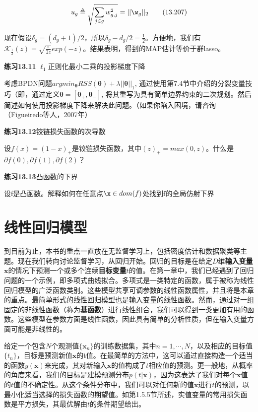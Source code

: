 \documentclass[a4paper]{article}
\begin{document}
\begin{equation}
	u_g\triangleq\sqrt{\sum_{j\in g}w_{g,j}^2}=||\w_g||_2\tag{13.207}
\end{equation}

现在假设$\delta_g=(d_g+1)/2$，所以$\delta_g-d_g/2=\frac{1}{2}$。方便地，我们有$\mathcal{K}_{\frac{1}{2}}(z)=\sqrt{\frac{\pi}{2z}}exp(-z)$。结果表明，得到的MAP估计等价于群lasso。

\textbf{练习13.11} $\ell_1$正则化最小二乘的投影梯度下降

考虑BPDN问题$argmin_{\boldsymbol{\theta}}RSS(\boldsymbol{\theta})+\lambda||\boldsymbol{\theta}||_1$, 通过使用第7.4节中介绍的分裂变量技巧（即，通过定义$\boldsymbol{\theta}=[\boldsymbol{\theta}_+,\boldsymbol{\theta}_-]$, 将其重写为具有简单边界约束的二次规划。然后简述如何使用投影梯度下降来解决此问题。（如果你陷入困境，请咨询（Figueiredo等人，2007年）

\textbf{练习13.12}铰链损失函数的次导数

设$f(x)=(1-x)_+$是铰链损失函数，其中$(z)_+=max(0,z)$。什么是$\partial
f(0),\partial
f(1),\partial
f(2)$？

\textbf{练习13.13}凸函数的下界

设f是凸函数。解释如何在任意点$\x\in dom(f)$处找到f的全局仿射下界


\clearpage
\section{线性回归模型}

到目前为止，本书的重点一直放在无监督学习上，包括密度估计和数据聚类等主题。现在我们转向讨论监督学习，从回归开始。回归的目标是在给定$D$维\textbf{输入变量}$\mathbf{x}$的情况下预测一个或多个连续\textbf{目标变量}$t$的值。在第一章中，我们已经遇到了回归问题的一个示例，即多项式曲线拟合。多项式是一类特定的函数，属于被称为线性回归模型的广泛函数类别。这些模型共享可调参数的线性函数属性，并且将是本章的重点。最简单形式的线性回归模型也是输入变量的线性函数。然而，通过对一组固定的非线性函数（称为\textbf{基函数}）进行线性组合，我们可以得到一类更加有用的函数。这些模型在参数方面是线性函数，因此具有简单的分析性质，但在输入变量方面可能是非线性的。

给定一个包含$N$个观测值$\{\mathbf{x}_n\}$的训练数据集，其中$n =1,\cdots,N$，以及相应的目标值$\{t_n\}$，目标是预测新值$\mathbf{x}$的t值。在最简单的方法中，这可以通过直接构造一个适当的函数$y(\mathbf{x})$来完成，其对新输入$\mathbf{x}$的值构成了$t$相应值的预测。更一般地，从概率的角度来看，我们的目标是建模预测分布$p(t|\mathbf{x})$，因为这表达了我们对每个$\mathbf{x}$值的$t$值的不确定性。从这个条件分布中，我们可以对任何新的值$\mathbf{x}$进行$t$的预测，以最小化适当选择的损失函数的期望值。如第1.5.5节所述，实值变量的常用损失函数是平方损失，其最优解由$t$的条件期望给出。
\end{document}
